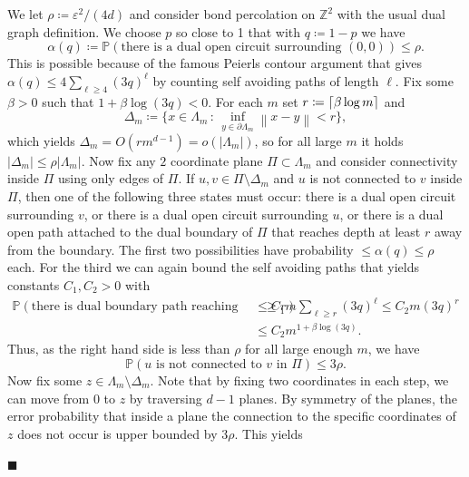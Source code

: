 \documentclass[11pt]{article}%
\newenvironment{proofof}[1]{\vspace{1ex}\noindent{\bf Proof of #1.}}{\hspace*{\fill}$\blacksquare$\vspace{1ex}}
\newcommand{\norm}[1]{\ensuremath{\left\|#1\right\|}}
\newcommand{\eps}{\varepsilon}
\newcommand{\ZZ}{\mathbb{Z}}
\newcommand{\Pro}{\mathbb{P}}
\DeclarePairedDelimiter{\ceil}{\lceil}{\rceil}
\begin{document}
\begin{proofof}{Lemma~\ref{dependentperco}}
    We let $\rho\coloneqq \eps^2/(4d)$ and consider bond percolation on $\ZZ^2$ with the usual dual graph definition. We choose $p$ so close to 1 that with $q\coloneqq 1-p$ we have 
    \begin{equation*}
        \alpha (q) \coloneqq\Pro( \text{there is a dual open circuit surrounding }(0,0))\leq \rho.
    \end{equation*}
    This is possible because of the famous Peierls contour argument that gives $\alpha(q)\leq 4\sum_{\ell\geq 4} (3q)^\ell$ by counting self avoiding paths of length $\ell$. Fix some $\beta>0$ such that $1+\beta \log(3q)<0$. For each $m$ set $r\coloneqq \ceil {\beta\log m}$ and 
    \begin{equation*}
        \Delta_m\coloneqq\{x\in \Lambda_m\,:\, \inf_{y\in \partial\Lambda_m} \norm{x-y}<r\},
    \end{equation*}
    which yields $\Delta_m=O(r m^{d-1})=o(|\Lambda_m|)$, so for all large $m$ it holds $|\Delta_m|\leq \rho|\Lambda_m|$. Now fix any $2$ coordinate plane $\Pi\subset \Lambda_m$ and 
    consider connectivity inside $\Pi$ using only edges of $\Pi$. If $u,v\in \Pi\setminus\Delta_m $ and $u$ is not connected to $v$ inside $\Pi$, then one of the following three states must occur: there is a dual open circuit surrounding $v$, or there is a dual open circuit surrounding $u$, or there is a dual open path attached to the dual boundary of $\Pi$ that reaches depth at least $r$ away from the boundary. The first two possibilities have probability $\leq \alpha(q)\leq \rho$ each. For the third we can again bound the self avoiding paths that yields constants $C_1,C_2>0$ with
    \begin{equation*}
    \begin{split}
        \Pro(\text{there is dual boundary path reaching depth}\geq r)&\leq  C_1m\sum_{\ell\geq r}(3q)^\ell \leq C_2 m(3q)^r \\&\leq C_2m^{1+\beta\log(3q)}.
    \end{split}
    \end{equation*}
    Thus, as the right hand side is less than $\rho$ for all large enough $m$, we have
    \begin{equation*}
        \Pro(u\text{ is not connected to }v \text{ in }\Pi)\leq 3\rho.
    \end{equation*}
     Now fix some $z\in \Lambda_m\setminus\Delta_m$. Note that by fixing two coordinates in each step, we can move from $0$ to $z$ by traversing $d-1$ planes. By symmetry of the planes, the error probability that inside a plane the connection to the specific coordinates of $z$ does not occur is upper bounded by $3\rho$. This yields

\end{proofof}
\end{document}
